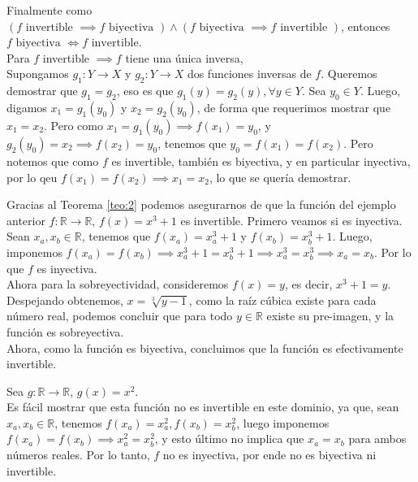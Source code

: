 \documentclass[12pt]{book}
\begin{document}
\begin{proofenv}
Finalmente como $(f \text{ invertible } \implies f \text{ biyectiva }) \wedge (f \text{ biyectiva } \implies f\text{ invertible })$, entonces $f \text{ biyectiva } \iff f\text{ invertible} $.\\

Para $f$ invertible $\implies f$ tiene una única inversa,\\

Supongamos $g_1:Y\to X$ y $g_2:Y\to X$ dos funciones inversas de $f$. Queremos demostrar que $g_1=g_2$, eso es que $g_1(y)=g_2(y), \forall y\in Y$. Sea $y_0\in Y$. Luego, digamos $x_1=g_1(y_0)$ y $x_2=g_2(y_0)$, de forma que requerimos mostrar que $x_1=x_2$. Pero como $x_1=g_1(y_0)\implies f(x_1)=y_0$, y $g_2(y_0)=x_2\implies f(x_2)=y_0$, tenemos que $y_0=f(x_1)=f(x_2)$. Pero notemos que como $f$ es invertible, también es biyectiva, y en particular inyectiva, por lo qeu $f(x_1)=f(x_2)\implies x_1=x_2$, lo que se quería demostrar.
\end{proofenv}

\begin{exampleenv}
    Gracias al Teorema \ref{teo:2} podemos asegurarnos de que la función del ejemplo anterior $f:\mathbb{R}\to\mathbb{R}$, $f(x)=x^3+1$ es invertible. Primero veamos si es inyectiva.\\

    Sean $x_a,x_b\in\mathbb{R}$, tenemos que $f(x_a)=x_a^3+1$ y $f(x_b)=x_b^3+1$. Luego, imponemos $f(x_a)=f(x_b)\implies x_a^3+1=x_b^3+1\implies x_a^3=x_b^3\implies x_a=x_b.$ Por lo que $f$ es inyectiva.\\

    Ahora para la sobreyectividad, consideremos $f(x)=y$, es decir, $x^3+1=y$. Despejando obtenemos, $x=\sqrt[3]{y-1}$, como la raíz cúbica existe para cada número real, podemos concluir que para todo $y\in\mathbb{R}$ existe su pre-imagen, y la función es sobreyectiva.\\

    Ahora, como la función es biyectiva, concluimos que la función es efectivamente invertible.
\end{exampleenv}

\begin{exampleenv}
    Sea $g:\mathbb{R}\to\mathbb{R}$, $g(x)=x^2$.\\

    Es fácil mostrar que esta función no es invertible en este dominio, ya que, sean $x_a,x_b\in\mathbb{R}$, tenemos $f(x_a)=x_a^2, f(x_b)=x_b^2$, luego imponemos $f(x_a)=f(x_b)\implies x_a^2=x_b^2$, y esto último no implica que $x_a=x_b$ para ambos números reales. Por lo tanto, $f$ no es inyectiva, por ende no es biyectiva ni invertible.
\end{exampleenv}
\end{document}
